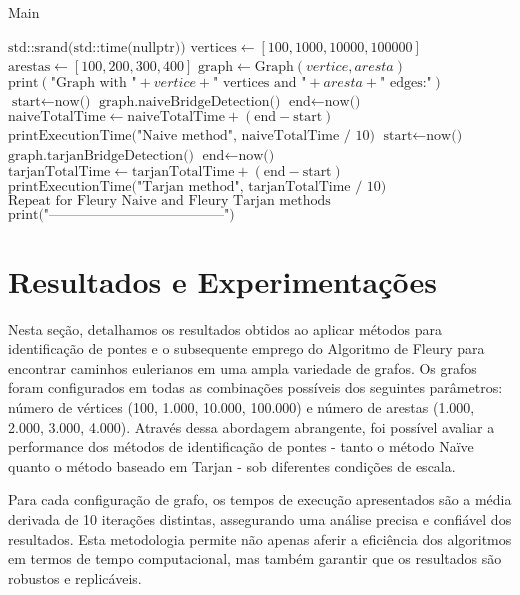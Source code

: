 \documentclass[12pt]{article}
\begin{document}
\begin{algorithm}
\caption{Main}
\begin{algorithmic}[1]
\State $\text{std::srand(std::time(nullptr))}$
\State $\text{vertices} \gets [100, 1000, 10000, 100000]$
\State $\text{arestas} \gets [100, 200, 300, 400]$
        \State $\text{graph} \gets \text{Graph}(vertice, aresta)$
        \State $\text{print}(\text{"Graph with "} + vertice + \text{" vertices and "} + aresta + \text{" edges:"})$
            \State $\text{start} \gets \text{now()}$
            \State $\text{graph.naiveBridgeDetection()}$
            \State $\text{end} \gets \text{now()}$
            \State $\text{naiveTotalTime} \gets \text{naiveTotalTime} + (\text{end} - \text{start})$
        \EndFor
        \State $\text{printExecutionTime("Naive method", naiveTotalTime / 10)}$
            \State $\text{start} \gets \text{now()}$
            \State $\text{graph.tarjanBridgeDetection()}$
            \State $\text{end} \gets \text{now()}$
            \State $\text{tarjanTotalTime} \gets \text{tarjanTotalTime} + (\text{end} - \text{start})$
        \EndFor
        \State $\text{printExecutionTime("Tarjan method", tarjanTotalTime / 10)}$
        \State $\text{Repeat for Fleury Naive and Fleury Tarjan methods}$
        \State $\text{print("--------------------------------------")}$        
    \EndFor
\EndFor
\end{algorithmic}
\end{algorithm}
\newpage
\section{Resultados e Experimentações}
Nesta seção, detalhamos os resultados obtidos ao aplicar métodos para identificação de pontes e o subsequente emprego do Algoritmo de Fleury para encontrar caminhos eulerianos em uma ampla variedade de grafos. Os grafos foram configurados em todas as combinações possíveis dos seguintes parâmetros: número de vértices (100, 1.000, 10.000, 100.000) e número de arestas (1.000, 2.000, 3.000, 4.000). Através dessa abordagem abrangente, foi possível avaliar a performance dos métodos de identificação de pontes - tanto o método Naïve quanto o método baseado em Tarjan - sob diferentes condições de escala.

Para cada configuração de grafo, os tempos de execução apresentados são a média derivada de 10 iterações distintas, assegurando uma análise precisa e confiável dos resultados. Esta metodologia permite não apenas aferir a eficiência dos algoritmos em termos de tempo computacional, mas também garantir que os resultados são robustos e replicáveis.
\end{document}
